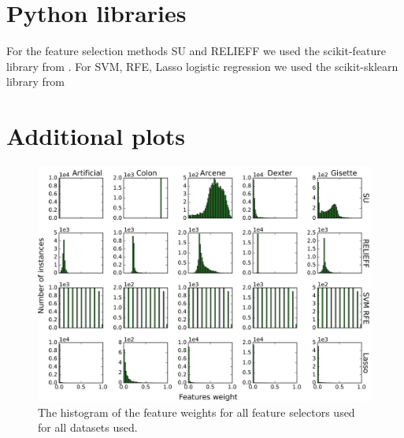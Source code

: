\documentclass[twoside,11pt]{article}
\begin{document}
\vskip 0.2in


\newpage

\appendix
\label{appendix}
\section{Python libraries}
\label{apd:libraries}
For the feature selection methods SU and RELIEFF we used the scikit-feature library from \cite{Li-etal16}.
For SVM, RFE, Lasso logistic regression we used the scikit-sklearn library from \cite{scikit-learn}
\section{Additional plots}
\label{apd:plots}
\begin{figure}[h!]
  \centering
    \includegraphics[width=\textwidth]{feature_weights_hist.png}
  \caption{The histogram of the feature weights for all feature selectors used for all datasets used.}
  \label{fig:feature_weights_hist}
\end{figure}

\end{document}
